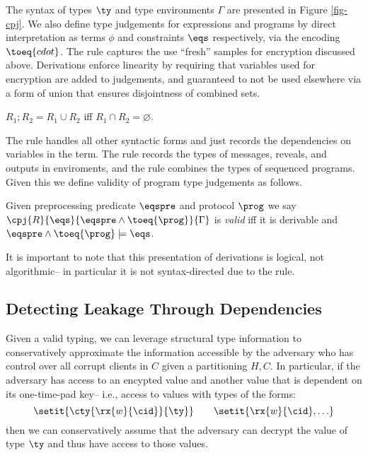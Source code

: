 \cpjfig

The syntax of types $\ty$ and type environments $\Gamma$ are presented
in Figure \ref{fig-cpj}. We also
define type judgements for expressions and programs by direct
interpretation as terms $\phi$ and constraints $\eqs$ respectively,
via the encoding $\toeq{cdot}$. The  rule captures
the use ``fresh'' samples for encryption discussed above. Derivations
enforce linearity by requiring that variables used for encryption
are added to judgements, and guaranteed to not be used elsewhere
via a form of union that ensures disjointness of combined sets. 
\begin{definition}
  $R_1;R_2 = R_1 \cup R_2$ iff $R_1 \cap R_2 = \varnothing$.
\end{definition}
The  rule handles all other syntactic forms and just
records the dependencies on variables in the term.  The 
rule records the types of messages, reveals, and outputs in
enviroments, and the  rule combines the types of
sequenced programs.  Given this we define validity of program type
judgements as follows. 
\begin{definition}
  Given preprocessing predicate $\eqspre$ and protocol $\prog$ we say
  $\cpj{R}{\eqs}{\eqspre \wedge \toeq{\prog}}{\Gamma}$ is \emph{valid} iff it is derivable and
  $\eqspre \wedge \toeq{\prog} \models \eqs$.
\end{definition}
It is important to note that this presentation of derivations is
logical, not algorithmic-- in particular it is not syntax-directed
due to the  rule.

\subsection{Detecting Leakage Through Dependencies}

Given a valid typing, we can leverage structural type information to
conservatively approximate the information accessible by the
adversary who has control over all corrupt clients in $C$ given
a partitioning $H,C$. In particular, if the adversary has access to an
encypted value and another value that is dependent on its one-time-pad
key-- i.e., access to values with types of the forms:
$$
\setit{\cty{\rx{w}{\cid}}{\ty}} \qquad \setit{\rx{w}{\cid}, \ldots} 
$$
then we can conservatively assume that the adversary can decrypt the
value of type $\ty$ and thus have access to those values.

